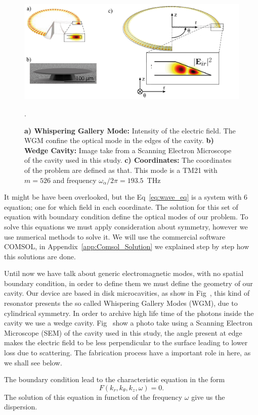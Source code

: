 \begin{figure}[b!]
    \centering
    \includegraphics[width =16cm]{Dissertation_wgm.jpg}
    \caption{\textbf{a) Whispering Gallery Mode:} Intensity of the electric field. The WGM confine the optical mode in the edges of the cavity. \textbf{b) Wedge Cavity:} Image take from a Scanning Electron Microscope of the cavity used in this study. \textbf{c) Coordinates:} The coordinates of the problem are defined as that. This mode is a TM21 with $m = 526$ and frequency $\omega_\alpha/2\pi = 193.5$~THz}.
    \label{fig:wgm}
\end{figure}
It might be have been overlooked, but the Eq~\ref{eq:wave_eq} is a system with 6 equation; one for which field in each coordinate. The solution for this set of equation with boundary condition define the optical modes of our problem. To solve this equations we must apply consideration about symmetry, however we use numerical methods to solve it. We will use the commercial software COMSOL\regmark, in Appendix~\ref{app:Comsol_Solution} we explained step by step how this solutions are done. 

Until now we have talk about generic electromagnetic modes, with no spatial boundary condition, in order to define them we must define the geometry of our cavity. Our device are based in disk microcavities, as show in Fig~, this kind of resonator presents the so called Whispering Gallery Modes (WGM), due to cylindrical symmetry. In order to archive high life time of the photons inside the cavity we use a wedge cavity. Fig~ show a photo take using a Scanning Electron Microscope (SEM) of the cavity used in this study, the angle present at edge makes the electric field to be less perpendicular to the surface leading to lower loss due to scattering\needcit. The fabrication process have a important role in here, as we shall see below. 

The boundary condition lead to the characteristic equation in the form 
\begin{equation}
    F(k_r,k_\theta,k_z,\omega) = 0.
    \label{eq:char_eq}
\end{equation}
The solution of this equation in function of the frequency $\omega$ give us the dispersion. 

